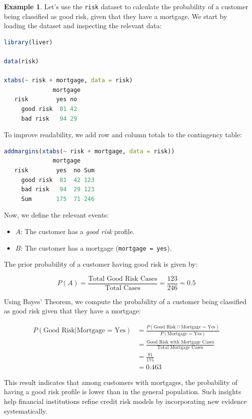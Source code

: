 \documentclass[
]{book}
\newcommand{\passthrough}[1]{#1}
\providecommand{\tightlist}{%
  \setlength{\itemsep}{0pt}\setlength{\parskip}{0pt}}
\theoremstyle{definition}
\theoremstyle{definition}
\newtheorem{example}{Example}[chapter]
\theoremstyle{definition}
\theoremstyle{definition}
\theoremstyle{remark}
\begin{document}
\begin{example}
\protect\hypertarget{exm:ex-bayes-risk}{}\label{exm:ex-bayes-risk}Let's use the \passthrough{\lstinline!risk!} dataset to calculate the probability of a customer being classified as good risk, given that they have a mortgage. We start by loading the dataset and inspecting the relevant data:

\begin{lstlisting}[language=R]
library(liver)         

data(risk)

xtabs(~ risk + mortgage, data = risk)
              mortgage
   risk        yes no
     good risk  81 42
     bad risk   94 29
\end{lstlisting}

To improve readability, we add row and column totals to the contingency table:

\begin{lstlisting}[language=R]
addmargins(xtabs(~ risk + mortgage, data = risk))
              mortgage
   risk        yes  no Sum
     good risk  81  42 123
     bad risk   94  29 123
     Sum       175  71 246
\end{lstlisting}

Now, we define the relevant events:

\begin{itemize}
\tightlist
\item
  \(A\): The customer has a \emph{good risk} profile.\\
\item
  \(B\): The customer has a mortgage (\passthrough{\lstinline!mortgage = yes!}).
\end{itemize}

The prior probability of a customer having good risk is given by:

\[
P(A) = \frac{\text{Total Good Risk Cases}}{\text{Total Cases}} = \frac{123}{246} = 0.5
\]

Using Bayes' Theorem, we compute the probability of a customer being classified as good risk given that they have a mortgage:

\begin{equation} 
\label{eq1}
\begin{split}
P(\text{Good Risk} | \text{Mortgage = Yes}) & = \frac{P(\text{Good Risk} \cap \text{Mortgage = Yes})}{P(\text{Mortgage = Yes})} \\
 & = \frac{\text{Good Risk with Mortgage Cases}}{\text{Total Mortgage Cases}} \\
 & = \frac{81}{175} \\
 & = 0.463
\end{split}
\end{equation}

This result indicates that among customers with mortgages, the probability of having a good risk profile is lower than in the general population. Such insights help financial institutions refine credit risk models by incorporating new evidence systematically.
\end{example}
\end{document}
